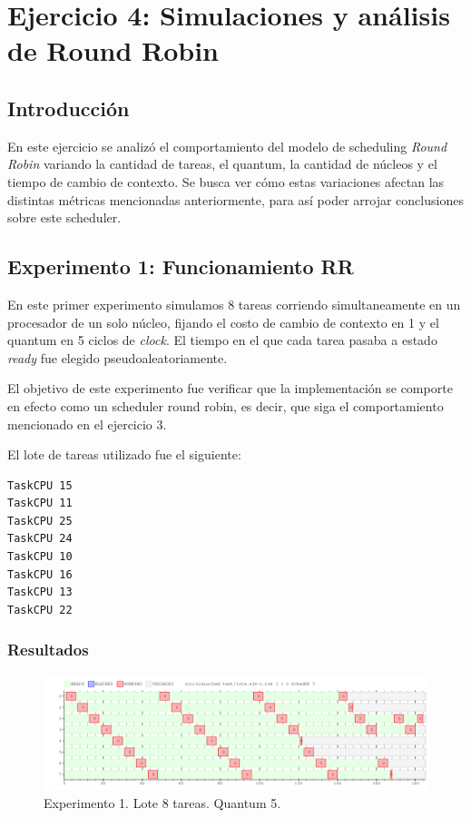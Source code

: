 \documentclass[a4paper]{article}
\begin{document}
\section{Ejercicio 4: Simulaciones y análisis de Round Robin}

\subsection{Introducción}
En este ejercicio se analizó el comportamiento del modelo de scheduling
\textit{Round Robin} variando la cantidad de tareas, el quantum, la cantidad
de núcleos y el tiempo de cambio de contexto. Se busca ver cómo estas
variaciones afectan las distintas métricas mencionadas anteriormente, para
así poder arrojar conclusiones sobre este scheduler.

\subsection{Experimento 1: Funcionamiento RR}
En este primer experimento simulamos 8 tareas corriendo simultaneamente en
un procesador de un solo núcleo, fijando el costo de cambio de contexto en 1
y el quantum en 5 ciclos de \textit{clock}. El tiempo en el que cada tarea
pasaba a estado \textit{ready} fue elegido pseudoaleatoriamente.

El objetivo de este experimento fue verificar que la implementación se
comporte en efecto como un scheduler round robin, es decir, que siga el
comportamiento mencionado en el ejercicio 3.

El lote de tareas utilizado fue el siguiente:

\begin{verbatim}
TaskCPU 15
TaskCPU 11
TaskCPU 25
TaskCPU 24
TaskCPU 10
TaskCPU 16
TaskCPU 13
TaskCPU 22
\end{verbatim}


\subsubsection{Resultados}
\begin{figure}[htb]
\begin{center}
\includegraphics[scale=0.4]{imagenes/ej4-1.png}
\end{center}
\caption{Experimento 1. Lote 8 tareas. Quantum 5.}
\end{figure}
\end{document}
